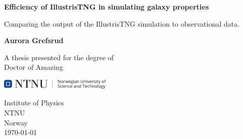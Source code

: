 \begin{titlepage}
   \begin{center}
       \vspace*{1cm}

       \textbf{Efficiency of IllustrisTNG in simulating galaxy properties}

       \vspace{0.5cm}
        Comparing the output of the IllustrisTNG simulation to observational data.
            
       \vspace{1.5cm}

       \textbf{Aurora Grefsrud}

       \vfill
            
       A thesis presented for the degree of\\
       Doctor of Amazing
            
       \vspace{0.8cm}
     
       \includegraphics[width=0.4\textwidth]{images/ntnu.png}
            
       Institute of Physics\\
       NTNU\\
       Norway\\
       \today
            
   \end{center}
\end{titlepage}